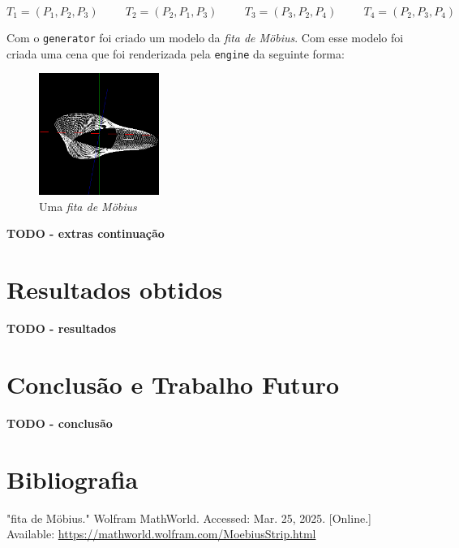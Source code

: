 \documentclass[12pt, a4paper]{article}
\begin{document}
$$
T_1 = (P_1, P_2, P_3)
\hspace{1cm}
T_2 = (P_2, P_1, P_3)
\hspace{1cm}
T_3 = (P_3, P_2, P_4)
\hspace{1cm}
T_4 = (P_2, P_3, P_4)
$$

Com o \texttt{generator} foi criado um modelo da \emph{fita de Möbius}. Com esse modelo
foi criada uma cena que foi renderizada pela \texttt{engine} da seguinte forma:

\begin{figure}[H]
    \centering
    \includegraphics[width=0.35\textwidth]{res/phase2/figures/MobiusStrip.png}
    \caption{Uma \emph{fita de Möbius}}
\end{figure}

\textbf{\color{red} TODO - extras continuação}

\section{Resultados obtidos}

\textbf{\color{red} TODO - resultados}

\section{Conclusão e Trabalho Futuro}

\textbf{\color{red} TODO - conclusão}

\begingroup
\section{Bibliografia}
\renewcommand{\section}[2]{}

\begin{thebibliography}{9}
        "fita de Möbius."{} Wolfram MathWorld. Accessed: Mar. 25, 2025. [Online.] Available:
        \url{https://mathworld.wolfram.com/MoebiusStrip.html}
\end{thebibliography}
\endgroup
\end{document}
